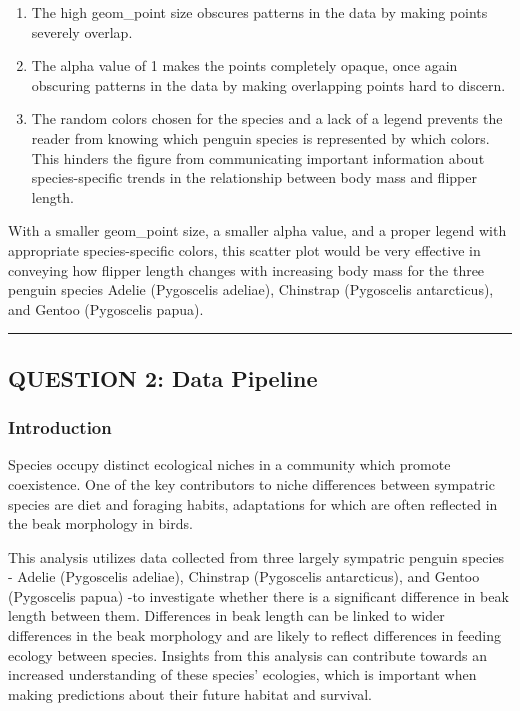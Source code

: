 \documentclass[
]{article}
\begin{document}
\begin{enumerate}
\def\labelenumi{\arabic{enumi}.}
\item
  The high geom\_point size obscures patterns in the data by making
  points severely overlap.
\item
  The alpha value of 1 makes the points completely opaque, once again
  obscuring patterns in the data by making overlapping points hard to
  discern.
\item
  The random colors chosen for the species and a lack of a legend
  prevents the reader from knowing which penguin species is represented
  by which colors. This hinders the figure from communicating important
  information about species-specific trends in the relationship between
  body mass and flipper length.
\end{enumerate}

With a smaller geom\_point size, a smaller alpha value, and a proper
legend with appropriate species-specific colors, this scatter plot would
be very effective in conveying how flipper length changes with
increasing body mass for the three penguin species Adelie (Pygoscelis
adeliae), Chinstrap (Pygoscelis antarcticus), and Gentoo (Pygoscelis
papua).

\begin{center}\rule{0.5\linewidth}{0.5pt}\end{center}

\subsection{QUESTION 2: Data Pipeline}\label{question-2-data-pipeline}

\subsubsection{Introduction}\label{introduction}

Species occupy distinct ecological niches in a community which promote
coexistence. One of the key contributors to niche differences between
sympatric species are diet and foraging habits, adaptations for which
are often reflected in the beak morphology in birds.

This analysis utilizes data collected from three largely sympatric
penguin species - Adelie (Pygoscelis adeliae), Chinstrap (Pygoscelis
antarcticus), and Gentoo (Pygoscelis papua) -to investigate whether
there is a significant difference in beak length between them.
Differences in beak length can be linked to wider differences in the
beak morphology and are likely to reflect differences in feeding ecology
between species. Insights from this analysis can contribute towards an
increased understanding of these species' ecologies, which is important
when making predictions about their future habitat and survival.
\end{document}
